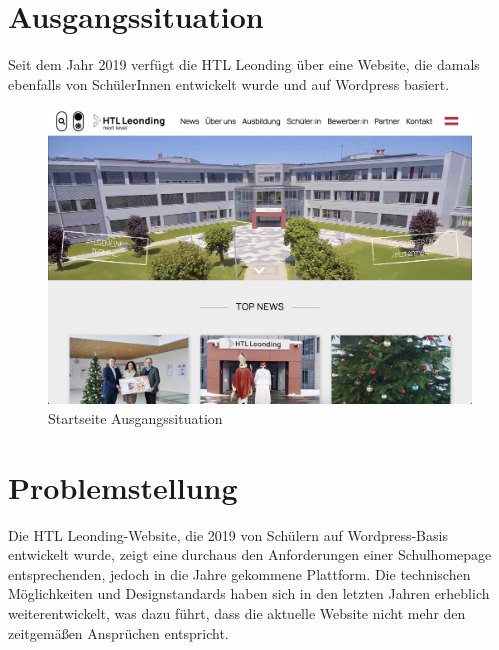 \section{Ausgangssituation}
Seit dem Jahr 2019 verfügt die HTL Leonding über eine Website, 
die damals ebenfalls von SchülerInnen entwickelt wurde und auf Wordpress basiert. 

\begin{figure}
    \centering
    \includegraphics[scale=0.3]{pics/startseite_ausgangslage.png}
    \caption{Startseite Ausgangssituation}
    \label{fig:impl:startseite_ausgangslage}
\end{figure}


\section{Problemstellung}
Die HTL Leonding-Website, die 2019 von Schülern auf Wordpress-Basis entwickelt wurde, 
zeigt eine durchaus den Anforderungen einer Schulhomepage entsprechenden, 
jedoch in die Jahre gekommene Plattform. Die technischen Möglichkeiten und Designstandards haben 
sich in den letzten Jahren erheblich weiterentwickelt, was dazu führt, dass die aktuelle 
Website nicht mehr den zeitgemäßen Ansprüchen entspricht. 

